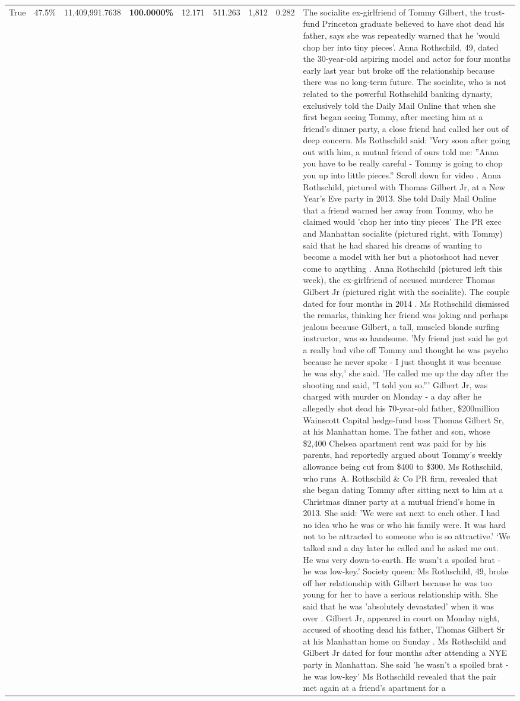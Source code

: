 \begin{table}[H]
\begin{tabular}{lllrlllll}
True & 47.5\% & 11,409,991.7638 & \bfseries \color{red} 100.0000\% & 12.171 & 511.263 & 1,812 & 0.282 & The socialite ex-girlfriend of Tommy Gilbert, the trust-fund Princeton graduate believed to have shot dead his father, says she was repeatedly warned that he 'would chop her into tiny pieces'. Anna Rothschild, 49, dated the 30-year-old aspiring model and actor for four months early last year but broke off the relationship because there was no long-term future. The socialite, who is not related to the powerful Rothschild banking dynasty, exclusively told the Daily Mail Online that when she first began seeing Tommy, after meeting him at a friend's dinner party, a close friend had called her out of deep concern. Ms Rothschild said: 'Very soon after going out with him, a mutual friend of ours told me: ''Anna you have to be really careful - Tommy is going to chop you up into little pieces.'' Scroll down for video . Anna Rothschild, pictured with Thomas Gilbert Jr, at a New Year's Eve party in 2013. She told Daily Mail Online that a friend warned her away from Tommy, who he claimed would 'chop her into tiny pieces' The PR exec and Manhattan socialite (pictured right, with Tommy) said that he had shared his dreams of wanting to become a model with her but a photoshoot had never come to anything . Anna Rothschild (pictured left this week), the ex-girlfriend of accused murderer Thomas Gilbert Jr (pictured right with the socialite). The couple dated for four months in 2014 . Ms Rothschild dismissed the remarks, thinking her friend was joking and perhaps jealous because Gilbert, a tall, muscled blonde surfing instructor, was so handsome. 'My friend just said he got a really bad vibe off Tommy and thought he was psycho because he never spoke - I just thought it was because he was shy,' she said. 'He called me up the day after the shooting and said, ''I told you so.''' Gilbert Jr, was charged with murder on Monday - a day after he allegedly shot dead his 70-year-old father, \$200million Wainscott Capital hedge-fund boss Thomas Gilbert Sr, at his Manhattan home. The father and son, whose \$2,400 Chelsea apartment rent was paid for by his parents, had reportedly argued about Tommy's weekly allowance being cut from \$400 to \$300. Ms Rothschild, who runs A. Rothschild \& Co PR firm, revealed that she began dating Tommy after sitting next to him at a Christmas dinner party at a mutual friend's home in 2013. She said: 'We were sat next to each other. I had no idea who he was or who his family were. It was hard not to be attracted to someone who is so attractive.' ‘We talked and a day later he called and he asked me out. He was very down-to-earth. He wasn’t a spoiled brat - he was low-key.’ Society queen: Ms Rothschild, 49, broke off her relationship with Gilbert because he was too young for her to have a serious relationship with. She said that he was 'absolutely devastated' when it was over . Gilbert Jr, appeared in court on Monday night, accused of shooting dead his father, Thomas Gilbert Sr at his Manhattan home on Sunday . Ms Rothschild and Gilbert Jr dated for four months after attending a NYE party in Manhattan. She said 'he wasn't a spoiled brat - he was low-key' Ms Rothschild revealed that the pair met again at a friend’s apartment for a 
\end{tabular}
\end{table}

